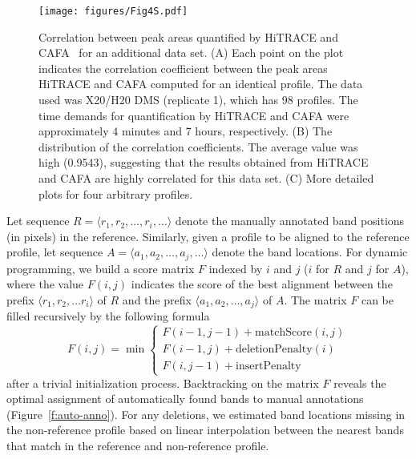 \documentclass[letter]{bioinfo}
\begin{document}


\begin{figure}
\centering
    \texttt{[image: figures/Fig4S.pdf]}
\caption{Correlation between peak areas quantified by HiTRACE and CAFA~\citep{mitra2008high} for an additional data set. (A) Each point on the plot indicates the correlation coefficient between the peak areas HiTRACE and CAFA computed for an identical profile. The data used was X20/H20 DMS (replicate 1), which has 98 profiles. The time demands for quantification by HiTRACE and CAFA were approximately 4 minutes and 7 hours, respectively. (B) The distribution of the correlation coefficients. The average value was high (0.9543), suggesting that the results obtained from HiTRACE and CAFA are highly correlated for this data set. (C) More detailed plots for four arbitrary profiles. %
}
\label{f:corr-cafa-hitrace}
\end{figure}
Let sequence $R=\langle r_1, r_2,\ldots,r_i,\ldots \rangle$ denote the manually annotated band positions (in pixels) in the reference. Similarly, given a profile to be aligned to the reference profile, let sequence $A=\langle a_1, a_2,\ldots,a_j,\ldots \rangle$ denote the band locations. For dynamic programming, we build a score matrix $F$ indexed by $i$ and $j$ ($i$ for $R$ and $j$ for $A$), where the value $F(i,j)$ indicates the score of the best alignment between the prefix $\langle r_1,r_2,\ldots r_i\rangle$ of $R$ and the prefix $\langle a_1,a_2,\ldots, a_j\rangle$ of $A$. The matrix $F$ can be filled recursively by the following formula
%
\begin{equation}
F(i,j) = \min
    \begin{cases}
        F(i - 1, j - 1) + \mathrm{matchScore}(i,j)\\
        F(i - 1, j ) + \mathrm{deletionPenalty}(i)\\
        F(i, j - 1) + \mathrm{insertPenalty}
    \end{cases}
\end{equation}
after a trivial initialization process. Backtracking on the matrix $F$ reveals the optimal assignment of automatically found bands to manual annotations (Figure~\ref{f:auto-anno}). For any deletions, we estimated band locations missing in the non-reference profile based on linear interpolation between the nearest bands that match in the reference and non-reference profile.
\end{document}
